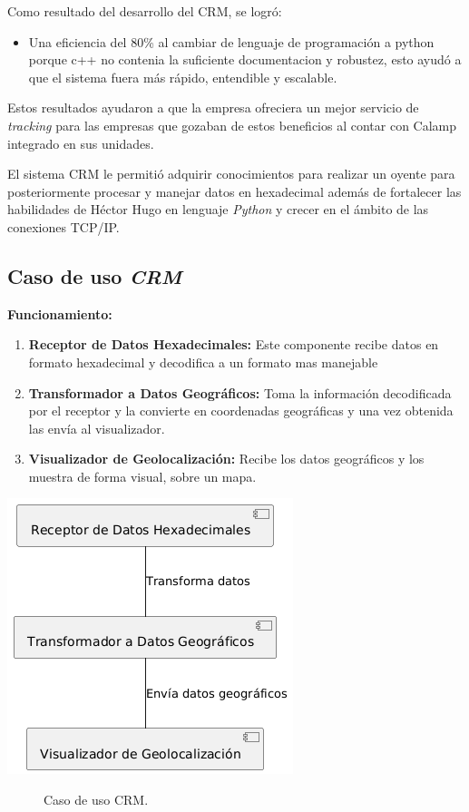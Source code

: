 \documentclass[protocolo.tex]{subfiles}
\begin{document}
Como resultado del desarrollo del CRM, se logró:

\begin{itemize}
    \item Una eficiencia del 80\% al cambiar de lenguaje de programación a python porque c++ no contenia la suficiente documentacion y robustez, esto ayudó a que el sistema fuera más rápido, entendible y escalable.
\end{itemize}

Estos resultados ayudaron a que la empresa ofreciera un mejor servicio de \textit{tracking} para las empresas que gozaban de estos beneficios al contar con Calamp integrado en sus unidades. \vspace{4mm}

El sistema CRM le permitió adquirir conocimientos para realizar un oyente para posteriormente procesar y manejar datos en hexadecimal además de fortalecer las habilidades de Héctor Hugo en lenguaje \textit{Python} y crecer en el ámbito de las conexiones TCP/IP.

\subsection{Caso de uso \textit{CRM}} 
\textbf{Funcionamiento:}
\begin{enumerate}
    \item \textbf{Receptor de Datos Hexadecimales:}  
    Este componente recibe datos en formato hexadecimal y decodifica a un formato mas manejable
    \item \textbf{Transformador a Datos Geográficos:}  
    Toma la información decodificada por el receptor y la convierte en coordenadas geográficas y una vez obtenida las envía al visualizador.
    \item \textbf{Visualizador de Geolocalización:}  
    Recibe los datos geográficos y los muestra de forma visual, sobre un mapa.
    
\end{enumerate}
\begin{center}
\includegraphics[scale=0.6]{Imagenes/listener.png}
\end{center}
\begin{figure}[h]  %
    \centering
    \caption{Caso de uso CRM.}
    \label{fig:mi-figura3}
\end{figure}
\end{document}
